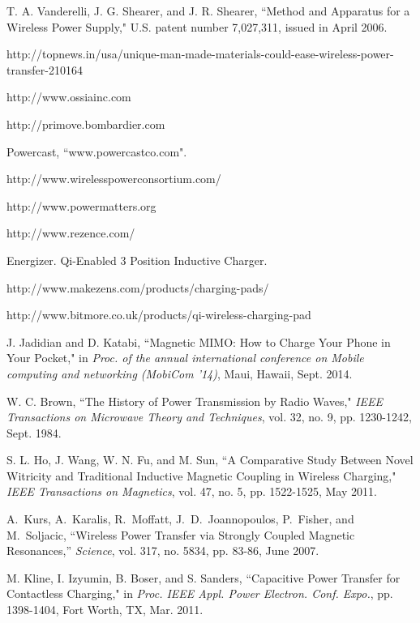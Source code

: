 \documentclass[twocolumn,10pt]{IEEEtran}
\begin{document}
\begin{thebibliography}{99}
T. A. Vanderelli, J. G. Shearer, and J. R. Shearer, ``Method and Apparatus for a Wireless Power Supply," U.S. patent number 7,027,311, issued in April 2006.

http://topnews.in/usa/unique-man-made-materials-could-ease-wireless-power-transfer-210164

http://www.ossiainc.com

http://primove.bombardier.com

Powercast, ``www.powercastco.com".

http://www.wirelesspowerconsortium.com/

http://www.powermatters.org

http://www.rezence.com/


Energizer. Qi-Enabled 3 Position Inductive Charger.

http://www.makezens.com/products/charging-pads/

http://www.bitmore.co.uk/products/qi-wireless-charging-pad

J. Jadidian and D. Katabi, ``Magnetic MIMO: How to Charge Your Phone in Your Pocket," in \emph{Proc. of the annual international conference on Mobile computing and networking (MobiCom '14)}, Maui, Hawaii, Sept. 2014.

W. C. Brown, ``The History of Power Transmission by Radio Waves,"  \emph{IEEE Transactions on Microwave Theory and Techniques}, vol. 32, no. 9, pp. 1230-1242, Sept. 1984.




 S. L. Ho, J. Wang, W. N. Fu, and M. Sun, ``A Comparative Study Between Novel Witricity and Traditional Inductive Magnetic Coupling in Wireless Charging," \emph{IEEE Transactions on Magnetics}, vol. 47, no. 5, pp. 1522-1525, May 2011. 

A.~Kurs, A.~Karalis, R.~Moffatt, J.~D.~Joannopoulos, P.~Fisher, and M.~Soljacic, ``Wireless Power Transfer via Strongly Coupled Magnetic Resonances,'' \emph{Science}, vol. 317, no. 5834, pp. 83-86, June 2007.



M. Kline, I. Izyumin, B. Boser, and S. Sanders, ``Capacitive Power Transfer for Contactless Charging," in \emph{Proc. IEEE Appl. Power Electron.
Conf. Expo.}, pp. 1398-1404, Fort Worth, TX, Mar. 2011.



\end{thebibliography}
\end{document}
